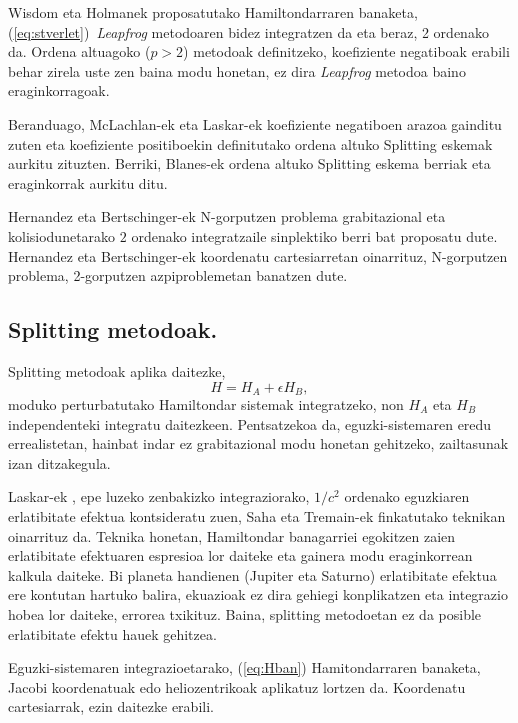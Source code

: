 Wisdom eta Holmanek proposatutako Hamiltondarraren banaketa, (\ref{eq:stverlet})~\emph{Leapfrog} metodoaren bidez integratzen da eta beraz, 2 ordenako da. Ordena altuagoko ($p>2$) metodoak definitzeko, koefiziente negatiboak erabili behar zirela uste zen \cite{Yoshida1993,Laskar2001} baina modu honetan, ez dira \emph{Leapfrog} metodoa baino eraginkorragoak.

Beranduago, McLachlan-ek \cite[1995]{McLachlan1995} eta Laskar-ek  \cite[2001]{Laskar2001} koefiziente negatiboen arazoa gainditu zuten eta koefiziente positiboekin definitutako ordena altuko Splitting eskemak aurkitu zituzten. Berriki, Blanes-ek \cite[2012]{Blanes2013} ordena altuko Splitting eskema berriak eta eraginkorrak aurkitu ditu. 

Hernandez eta Bertschinger-ek \cite[2015]{Hernandez2015} N-gorputzen problema grabitazional eta kolisiodunetarako $2$ ordenako integratzaile sinplektiko berri bat proposatu dute. Hernandez eta Bertschinger-ek \cite{Hernandez2015} koordenatu cartesiarretan oinarrituz, N-gorputzen problema, 2-gorputzen azpiproblemetan banatzen dute.


\subsection*{Splitting metodoak.}

Splitting metodoak aplika daitezke, 
\begin{equation}
\label{eq:Hban}
H=H_A+\epsilon H_B,
\end{equation}
moduko perturbatutako Hamiltondar sistemak integratzeko, non $H_A$ eta $H_B$ independenteki integratu daitezkeen. Pentsatzekoa da, eguzki-sistemaren eredu errealistetan, hainbat indar ez grabitazional modu honetan gehitzeko, zailtasunak izan ditzakegula.  

Laskar-ek \cite[2011]{Laskar2011}, epe luzeko zenbakizko integraziorako, $1/c^2$ ordenako eguzkiaren erlatibitate efektua   kontsideratu zuen, Saha eta Tremain-ek \cite{Saha1994} finkatutako teknikan oinarrituz da. Teknika honetan, Hamiltondar banagarriei egokitzen zaien erlatibitate efektuaren espresioa lor daiteke eta gainera modu eraginkorrean kalkula daiteke. Bi planeta handienen (Jupiter eta Saturno) erlatibitate efektua ere kontutan hartuko balira, ekuazioak ez dira gehiegi konplikatzen eta integrazio hobea lor daiteke, errorea txikituz. Baina, splitting metodoetan ez da posible erlatibitate efektu hauek gehitzea.
 
Eguzki-sistemaren integrazioetarako, (\ref{eq:Hban}) Hamitondarraren banaketa, Jacobi koordenatuak edo heliozentrikoak aplikatuz lortzen da.
Koordenatu cartesiarrak, ezin daitezke erabili.

